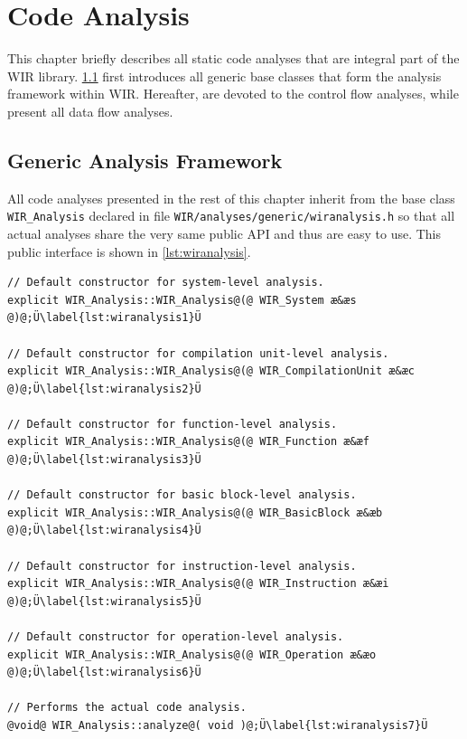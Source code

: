 \chapter{Code Analysis}
\label{chap:analysis}
\renewcommand{\sectiontitle}{}

This chapter briefly describes all static code analyses that are integral part of the \gls{WIR} library.
\cref{sec:containers} first introduces all generic base classes that form the analysis framework within \gls{WIR}.
Hereafter,  are devoted to the control flow analyses, while  present all data flow analyses.


\section{Generic Analysis Framework}
\label{sec:containers}

All code analyses presented in the rest of this chapter inherit from the base class \texttt{WIR\_Analysis} declared in file \texttt{WIR/analyses/generic/wiranalysis.h} so that all actual analyses share the very same public \gls{API} and thus are easy to use.
This public interface is shown in \cref{lst:wiranalysis}.

\begin{lstlisting}[style=code,float=ht,caption={Code Analysis API of Class \texttt{WIR\_Analysis}},label=lst:wiranalysis]
// Default constructor for system-level analysis.
explicit WIR_Analysis::WIR_Analysis@(@ WIR_System æ&æs @)@;Ü\label{lst:wiranalysis1}Ü

// Default constructor for compilation unit-level analysis.
explicit WIR_Analysis::WIR_Analysis@(@ WIR_CompilationUnit æ&æc @)@;Ü\label{lst:wiranalysis2}Ü

// Default constructor for function-level analysis.
explicit WIR_Analysis::WIR_Analysis@(@ WIR_Function æ&æf @)@;Ü\label{lst:wiranalysis3}Ü

// Default constructor for basic block-level analysis.
explicit WIR_Analysis::WIR_Analysis@(@ WIR_BasicBlock æ&æb @)@;Ü\label{lst:wiranalysis4}Ü

// Default constructor for instruction-level analysis.
explicit WIR_Analysis::WIR_Analysis@(@ WIR_Instruction æ&æi @)@;Ü\label{lst:wiranalysis5}Ü

// Default constructor for operation-level analysis.
explicit WIR_Analysis::WIR_Analysis@(@ WIR_Operation æ&æo @)@;Ü\label{lst:wiranalysis6}Ü

// Performs the actual code analysis.
@void@ WIR_Analysis::analyze@( void )@;Ü\label{lst:wiranalysis7}Ü
\end{lstlisting}

